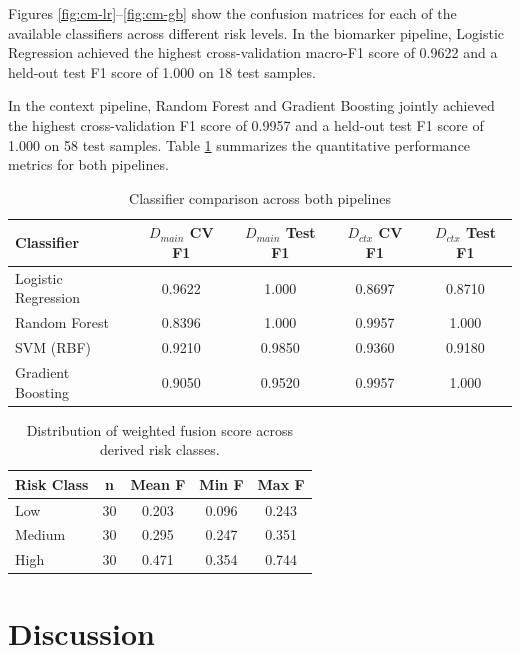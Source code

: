 Figures \ref{fig:cm-lr}--\ref{fig:cm-gb} show the confusion matrices for each of the available classifiers across different risk levels. In the biomarker pipeline, Logistic Regression achieved the highest cross-validation macro-F1 score of 0.9622 and a held-out test F1 score of 1.000 on 18 test samples. 

In the context pipeline, Random Forest and Gradient Boosting jointly achieved the highest cross-validation F1 score of 0.9957 and a held-out test F1 score of 1.000 on 58 test samples. Table \ref{tab:classifier-comparison} summarizes the quantitative performance metrics for both pipelines.

\begin{table}[htb]
\fontsize{10}{12}\selectfont
\centering
\caption{Classifier comparison across both pipelines}
\label{tab:classifier-comparison}
\begin{tabular}{|p{3.4cm}|c|c|c|c|}
\hline
\textbf{Classifier} & \textbf{$D_{main}$ CV F1} & \textbf{$D_{main}$ Test F1} & \textbf{$D_{ctx}$ CV F1} & \textbf{$D_{ctx}$ Test F1}\\
\hline
Logistic Regression & 0.9622 & 1.000 & 0.8697 & 0.8710\\
\hline
Random Forest & 0.8396 & 1.000 & 0.9957 & 1.000\\
\hline
SVM (RBF) & 0.9210 & 0.9850 & 0.9360 & 0.9180\\
\hline
Gradient Boosting & 0.9050 & 0.9520 & 0.9957 & 1.000\\
\hline
\end{tabular}
\end{table}

\begin{table}[htb]
\small
\centering
\caption{Distribution of weighted fusion score across derived risk classes.}
\label{tab:fusion-score-dist}
\begin{tabular}{lcccc}
\toprule
\textbf{Risk Class} & \textbf{n} & \textbf{Mean F} & \textbf{Min F} & \textbf{Max F} \\
\midrule
Low & 30 & 0.203 & 0.096 & 0.243 \\
Medium & 30 & 0.295 & 0.247 & 0.351 \\
High & 30 & 0.471 & 0.354 & 0.744 \\
\bottomrule
\end{tabular}
\end{table}

\section{Discussion}

